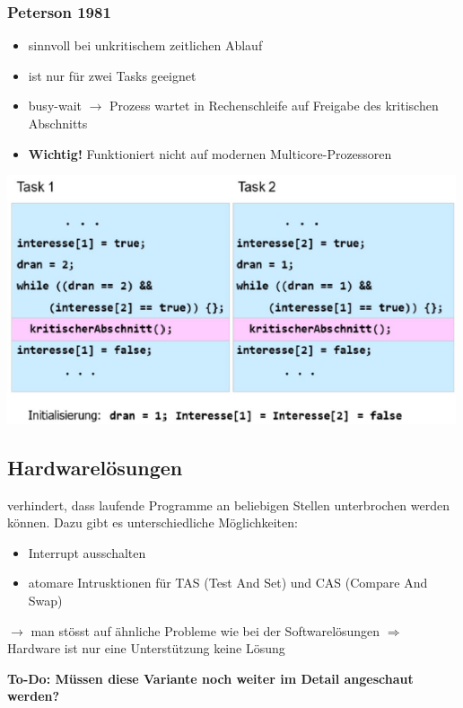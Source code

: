 \documentclass{report}
\newenvironment{Figure}
	{\par\medskip\noindent\minipage{\linewidth}}
	{\endminipage\par\medskip}
\theoremstyle{definition}
\theoremstyle{example}
\begin{document}
		\subsubsection{Peterson 1981}
\begin{itemize}
	\item sinnvoll bei unkritischem zeitlichen Ablauf
	\item ist nur für zwei Tasks geeignet
	\item busy-wait $\rightarrow$ Prozess wartet in Rechenschleife auf Freigabe des kritischen Abschnitts
	\item \textbf{Wichtig!} Funktioniert nicht auf modernen Multicore-Prozessoren
\end{itemize}
\begin{Figure}
\centering
\includegraphics[width=500px]{img/Peterson1981.png}
	\label{fig:Lösungsansatz mit Peterson 1981}
\end{Figure}

	\subsection{Hardwarelösungen}
verhindert, dass laufende Programme an beliebigen Stellen unterbrochen werden können. Dazu gibt es unterschiedliche Möglichkeiten:

\begin{itemize}
	\item Interrupt ausschalten
	\item atomare Intrusktionen für TAS (Test And Set) und CAS (Compare And Swap)
\end{itemize}
$\rightarrow$ man stösst auf ähnliche Probleme wie bei der Softwarelösungen $\Rightarrow$ Hardware ist nur eine Unterstützung keine Lösung

\textbf{To-Do: Müssen diese Variante noch weiter im Detail angeschaut werden?}
\end{document}
